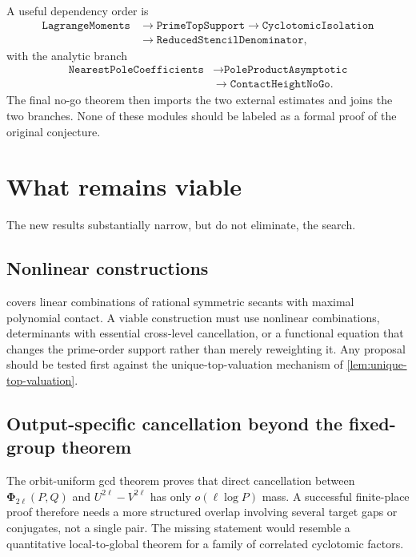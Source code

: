 \documentclass[11pt]{article}
\theoremstyle{definition}
\newcommand{\PhiHom}{\boldsymbol\Phi}
\begin{document}
A useful dependency order is
\begin{align*}
 \texttt{LagrangeMoments}
 &\longrightarrow \texttt{PrimeTopSupport}
 \longrightarrow \texttt{CyclotomicIsolation}\\
 &\longrightarrow \texttt{ReducedStencilDenominator},
\end{align*}
with the analytic branch
\begin{align*}
 \texttt{NearestPoleCoefficients}
 &\longrightarrow \texttt{PoleProductAsymptotic}\\
 &\longrightarrow \texttt{ContactHeightNoGo}.
\end{align*}
The final no-go theorem then imports the two external estimates and joins the
two branches.  None of these modules should be labeled as a formal proof of
the original conjecture.

\section{What remains viable}
\label{sec:remaining}

The new results substantially narrow, but do not eliminate, the search.

\subsection{Nonlinear constructions}

 covers linear combinations of rational symmetric
secants with maximal polynomial contact.  A viable construction must use
nonlinear combinations, determinants with essential cross-level
cancellation, or a functional equation that changes the prime-order support
rather than merely reweighting it.  Any proposal should be tested first
against the unique-top-valuation mechanism of \cref{lem:unique-top-valuation}.

\subsection{Output-specific cancellation beyond the fixed-group theorem}

The orbit-uniform gcd theorem proves that direct cancellation between
$\PhiHom_{2\ell}(P,Q)$ and $U^{2\ell}-V^{2\ell}$ has only
$o(\ell\log P)$ mass.  A successful finite-place proof therefore needs a
more structured overlap involving several target gaps or conjugates, not a
single pair.  The missing statement would resemble a quantitative
local-to-global theorem for a family of correlated cyclotomic factors.
\end{document}
